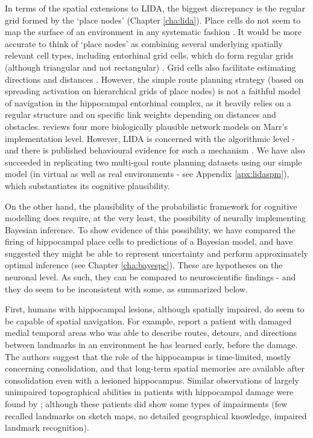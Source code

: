 In terms of the spatial extensions to LIDA, the biggest discrepancy is the regular grid formed by the `place nodes' (Chapter \ref{cha:lida}). Place cells do not seem to map the surface of an environment in any systematic fashion \citep{o1998place}. It would be more accurate to think of `place nodes' as combining several underlying spatially relevant cell types, including entorhinal grid cells, which do form regular grids (although triangular and not rectangular) \citep{moser2008place}. Grid cells also facilitate estimating directions and distances \citep{bush2015using}. However, the simple route planning strategy (based on spreading activation on hierarchical grids of place nodes) is not a faithful model of navigation in the hippocampal entorhinal complex, as it heavily relies on a regular structure and on specific link weights depending on distances and obstacles. \cite{bush2015using} reviews four more biologically plausible network models on Marr's implementation level. However, LIDA is concerned with the algorithmic level - and there is published behavioural evidence for such a mechanism \citep{mueller2013pathfinding}. We have also succeeded in replicating two multi-goal route planning datasets using our simple model (in virtual as well as real environments - see Appendix \ref{apx:lidaspm}), which substantiates its cognitive plausibility. 

On the other hand, the plausibility of the probabilistic framework for cognitive modelling does require, at the very least, the possibility of neurally implementing Bayesian inference. To show evidence of this possibility, we have compared the firing of hippocampal place cells to predictions of a Bayesian model, and have suggested they might be able to represent uncertainty and perform approximately optimal inference (see Chapter \ref{cha:bayespc}). These are hypotheses on the neuronal level. As such, they can be compared to neuroscientific findings - and they do seem to be inconsistent with some, as summarized below.

First, humans with hippocampal lesions, although spatially impaired, do seem to be capable of spatial navigation. For example, \citep{teng1999} report a patient with damaged medial temporal areas who was able to describe routes, detours, and directions between landmarks in an environment he has learned early, before the damage. The authors suggest that the role of the hippocampus is time-limited, mostly concerning consolidation, and that long-term spatial memories are available after consolidation even with a lesioned hippocampus. Similar observations of largely unimpaired topographical abilities in patients with hippocampal damage were found by \citep{rosenbaum2000, rosenbaum2005}; although these patients did show some types of impairments (few recalled landmarks on sketch maps, no detailed geographical knowledge, impaired landmark recognition). 

